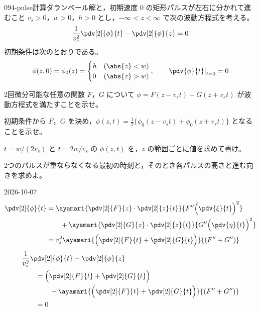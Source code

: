 \documentclass[uplatex,dvipdfmx,a4paper,11pt]{jsarticle}
\begin{document}
\begin{mondai}{094-pulse}{計算}{ダランベール解と，初期速度 0 の矩形パルスが左右に分かれて進むこと}
$v_s>0$，$w>0$，$h>0$ とし，$-\infty<z<\infty$ で次の波動方程式を考える。
  \[ \frac{1}{v_s^{2}}\pdv[2]{\phi}{t}-\pdv[2]{\phi}{z}=0 \]
  初期条件は次のとおりである。
  \[ \phi(z,0)=\phi_0(z)=\begin{cases}h&(\abs{z}<w)\\0&(\abs{z}>w)\end{cases},\qquad\left.\pdv{\phi}{t}\right|_{t=0}=0 \]
  \begin{shoumon}
    \item 2回微分可能な任意の関数 $F$，$G$ について $\phi=F(z-v_st)+G(z+v_st)$ が波動方程式を満たすことを示せ。
    \item 初期条件から $F$，$G$ を決め，$\phi(z,t)=\frac{1}{2}\{\phi_0(z-v_st)+\phi_0(z+v_st)\}$ となることを示せ。
    \item $t=w/(2v_s)$ と $t=2w/v_s$ の $\phi(z,t)$ を，$z$ の範囲ごとに値を求めて書け。
    \item 2つのパルスが重ならなくなる最初の時刻と，そのとき各パルスの高さと進む向きを求めよ。
  \end{shoumon}
\begin{kotaeutsushi}{2026-10-07}
\begin{align*}
  \pdv[2]{\phi}{t}&=\ayamari{\pdv[2]{F}{z}\cdot\pdv[2]{z}{t}}{F''\Bigl(\pdv{\xi}{t}\Bigr)^{2}}\\
  &\qquad+\ayamari{\pdv[2]{G}{z}\cdot\pdv[2]{z}{t}}{G''\Bigl(\pdv{\eta}{t}\Bigr)^{2}}\\
  &=v_s^{2}\ayamari{\Bigl(\pdv[2]{F}{t}+\pdv[2]{G}{t}\Bigr)}{(F''+G'')}
\end{align*}
\begin{align*}
  &\frac{1}{v_s^{2}}\pdv[2]{\phi}{t}-\pdv[2]{\phi}{z}\\
  &\qquad=\Bigl(\pdv[2]{F}{t}+\pdv[2]{G}{t}\Bigr)\\
  &\qquad\qquad-\ayamari{\Bigl(\pdv[2]{F}{t}+\pdv[2]{G}{t}\Bigr)}{(F''+G'')}\\
  &\qquad=0
\end{align*}

\end{kotaeutsushi}
\end{mondai}
\end{document}
